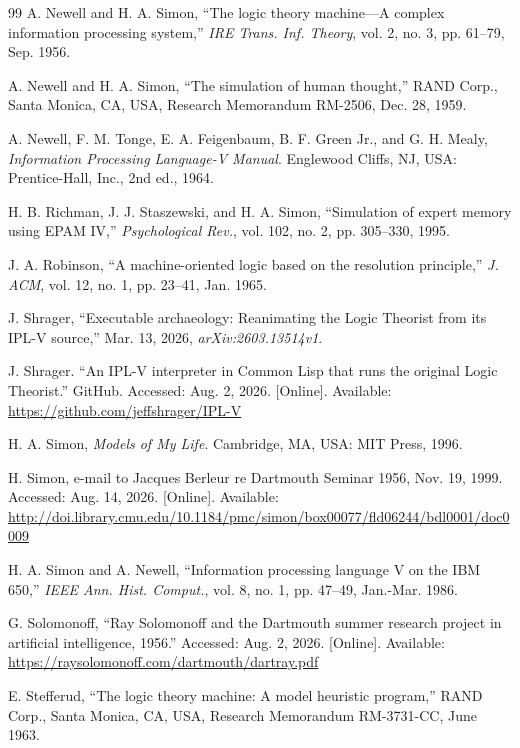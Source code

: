 \documentclass[journal]{IEEEtran}
\begin{document}
\begin{thebibliography}{99}
 A. Newell and H. A. Simon, ``The logic theory
  machine---A complex information processing system,'' \textit{IRE
  Trans. Inf. Theory}, vol. 2, no. 3, pp. 61--79, Sep. 1956.

 A. Newell and H. A. Simon,
  ``The simulation of human thought,''
  RAND Corp., Santa Monica, CA, USA,
  Research Memorandum RM-2506, Dec. 28, 1959.

 A. Newell, F. M. Tonge, E. A. Feigenbaum,
  B. F. Green Jr., and G. H. Mealy,
  \textit{Information
  Processing Language-V Manual}. Englewood Cliffs, NJ, USA:
  Prentice-Hall, Inc., 2nd ed., 1964.

 H. B. Richman, J. J. Staszewski, and
  H. A. Simon, ``Simulation of expert memory using EPAM IV,''
  \textit{Psychological Rev.}, vol. 102, no. 2, pp. 305--330, 1995.

 J. A. Robinson,
  ``A machine-oriented logic based on the resolution principle,''
  \textit{J. ACM}, vol. 12, no. 1, pp. 23--41, Jan. 1965.

 J. Shrager,
  ``Executable archaeology: Reanimating the Logic Theorist
  from its IPL-V source,''
  Mar. 13, 2026, \textit{arXiv:2603.13514v1}.

 J. Shrager.
  ``An IPL-V interpreter in Common Lisp that runs the original Logic
  Theorist.''
  GitHub.
  Accessed: Aug. 2, 2026.  [Online].
  Available: \url{https://github.com/jeffshrager/IPL-V}

 H. A. Simon, \textit{Models of My Life}.
  Cambridge, MA, USA: MIT Press, 1996.

 H. Simon, e-mail to Jacques Berleur
  re Dartmouth Seminar 1956, Nov. 19, 1999.
  Accessed: Aug. 14, 2026.  [Online].
  Available: \url{http://doi.library.cmu.edu/10.1184/pmc/simon/box00077/fld06244/bdl0001/doc0009}

 H. A. Simon and A. Newell,
  ``Information processing language V on the IBM 650,''
  \textit{IEEE Ann. Hist. Comput.}, vol. 8, no. 1, pp. 47--49, Jan.-Mar. 1986.

 G. Solomonoff,
  ``Ray Solomonoff and the Dartmouth summer research project in
  artificial intelligence, 1956.''
  Accessed: Aug. 2, 2026.  [Online].
  Available: \url{https://raysolomonoff.com/dartmouth/dartray.pdf}

 E. Stefferud,
  ``The logic theory machine: A model heuristic program,''
  RAND Corp., Santa Monica, CA, USA, Research Memorandum RM-3731-CC, June 1963.


\end{thebibliography}
\end{document}
